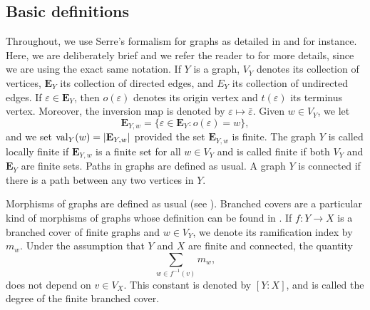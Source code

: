 \documentclass[11pt]{amsart}
\numberwithin{equation}{section}
\theoremstyle{remark}
\theoremstyle{definition}
\begin{document}
\subsection{Basic definitions} \label{section:bas}
Throughout, we use Serre's formalism for graphs as detailed in \cite{Serre:1977} and \cite{Sunada:2013} for instance.  Here, we are deliberately brief and we refer the reader to \cite{Gambheera/Vallieres:2024} for more details, since we are using the exact same notation.  If $Y$ is a graph, $V_{Y}$ denotes its collection of vertices, $\mathbf{E}_{Y}$ its collection of directed edges, and $E_{Y}$ its collection of undirected edges.  If $\varepsilon \in \mathbf{E}_{Y}$, then $o(\varepsilon)$ denotes its origin vertex and $t(\varepsilon)$ its terminus vertex.  Moreover, the inversion map is denoted by $\varepsilon \mapsto \bar{\varepsilon}$.  Given $w \in V_{Y}$, we let
$$\mathbf{E}_{Y,w} = \{\varepsilon \in \mathbf{E}_{Y}: o(\varepsilon) = w \}, $$
and we set ${\rm val}_{Y}(w) = |\mathbf{E}_{Y,w}|$ provided the set $\mathbf{E}_{Y,w}$ is finite.  The graph $Y$ is called locally finite if $\mathbf{E}_{Y,w}$ is a finite set for all $w \in V_{Y}$ and is called finite if both $V_{Y}$ and $\mathbf{E}_{Y}$ are finite sets.  Paths in graphs are defined as usual.  A graph $Y$ is connected if there is a path between any two vertices in $Y$.  

Morphisms of graphs are defined as usual (see \cite[Definition 2.1]{Gambheera/Vallieres:2024}).  Branched covers are a particular kind of morphisms of graphs whose definition can be found in \cite[Definition 3.1]{Gambheera/Vallieres:2024}.  If $f:Y \rightarrow X$ is a branched cover of finite graphs and $w \in V_{Y}$, we denote its ramification index by $m_{w}$.  Under the assumption that $Y$ and $X$ are finite and connected, the quantity
$$\sum_{w \in f^{-1}(v)} m_{w}, $$
does not depend on $v \in V_{X}$.  This constant is denoted by $[Y:X]$, and is called the degree of the finite branched cover.  

\end{document}
